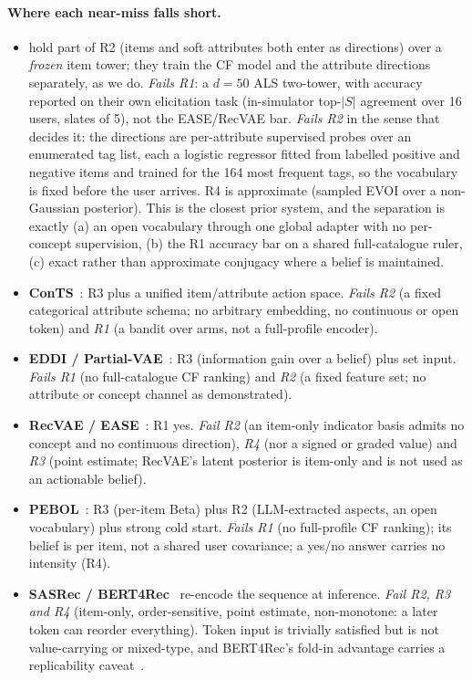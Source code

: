 \documentclass[acmsmall,review,anonymous]{acmart}
\begin{document}
\paragraph{Where each near-miss falls short.}
\begin{itemize}[leftmargin=1.4em,itemsep=2pt]
  \item \textbf{\citet{biyik2023soft}} hold part of R2 (items and soft attributes both enter as directions) over a \emph{frozen} item tower; they train the CF model and the attribute directions separately, as we do. \emph{Fails R1}: a $d{=}50$ ALS two-tower, with accuracy reported on their own elicitation task (in-simulator top-$|S|$ agreement over 16 users, slates of 5), not the EASE/RecVAE bar. \emph{Fails R2} in the sense that decides it: the directions are per-attribute supervised probes over an enumerated tag list, each a logistic regressor fitted from labelled positive and negative items and trained for the 164 most frequent tags, so the vocabulary is fixed before the user arrives. R4 is approximate (sampled EVOI over a non-Gaussian posterior). This is the closest prior system, and the separation is exactly (a) an open vocabulary through one global adapter with no per-concept supervision, (b) the R1 accuracy bar on a shared full-catalogue ruler, (c) exact rather than approximate conjugacy where a belief is maintained.
  \item \textbf{ConTS}~\citep{li2021seamlessly}: R3 plus a unified item/attribute action space. \emph{Fails R2} (a fixed categorical attribute schema; no arbitrary embedding, no continuous or open token) and \emph{R1} (a bandit over arms, not a full-profile encoder).
  \item \textbf{EDDI / Partial-VAE}~\citep{ma2019eddi}: R3 (information gain over a belief) plus set input. \emph{Fails R1} (no full-catalogue CF ranking) and \emph{R2} (a fixed feature set; no attribute or concept channel as demonstrated).
  \item \textbf{RecVAE / EASE}~\citep{ren2020recvae,steck2019ease}: R1 yes. \emph{Fail R2} (an item-only indicator basis admits no concept and no continuous direction), \emph{R4} (nor a signed or graded value) and \emph{R3} (point estimate; RecVAE's latent posterior is item-only and is not used as an actionable belief).
  \item \textbf{PEBOL}~\citep{austin2024bayesian}: R3 (per-item Beta) plus R2 (LLM-extracted aspects, an open vocabulary) plus strong cold start. \emph{Fails R1} (no full-profile CF ranking); its belief is per item, not a shared user covariance; a yes/no answer carries no intensity (R4).
  \item \textbf{SASRec / BERT4Rec}~\citep{kang2018sasrec,sun2019bert4rec} re-encode the sequence at inference. \emph{Fail R2, R3 and R4} (item-only, order-sensitive, point estimate, non-monotone: a later token can reorder everything). Token input is trivially satisfied but is not value-carrying or mixed-type, and BERT4Rec's fold-in advantage carries a replicability caveat~\citep{petrov2022replicability}.
\end{itemize}
\end{document}
